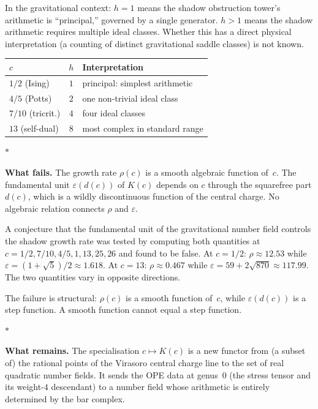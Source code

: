 \documentclass[11pt]{article}
\newcommand{\sep}{\bigskip\begin{center}$*$\end{center}\medskip}
\begin{document}
In the gravitational context: $h = 1$ means the shadow obstruction tower's
arithmetic is ``principal,'' governed by a single generator.
$h > 1$ means the shadow arithmetic requires multiple ideal
classes.  Whether this has a direct physical interpretation
(a counting of distinct gravitational saddle classes)
is not known.

\begin{center}
\small
\renewcommand{\arraystretch}{1.15}
\begin{tabular}{@{}lcl@{}}
$c$ & $h$ & \textbf{Interpretation} \\
\hline
$1/2$ (Ising) & $1$ & principal: simplest arithmetic \\[2pt]
$4/5$ (Potts) & $2$ & one non-trivial ideal class \\[2pt]
$7/10$ (tricrit.) & $4$ & four ideal classes \\[2pt]
$13$ (self-dual) & $8$ & most complex in standard range
\end{tabular}
\end{center}

\sep

\noindent\textbf{What fails.}\enspace
The growth rate $\rho(c)$ is a smooth algebraic function
of~$c$.  The fundamental unit $\varepsilon(d(c))$ of $K(c)$
depends on $c$ through the squarefree part $d(c)$, which is a
wildly discontinuous function of the central charge.  No
algebraic relation connects $\rho$ and $\varepsilon$.

A conjecture that the fundamental unit of the gravitational
number field controls the shadow growth rate was tested by
computing both quantities at $c = 1/2, 7/10, 4/5, 1, 13, 25, 26$
and found to be false.  At $c = 1/2$: $\rho \approx 12.53$
while $\varepsilon = (1+\sqrt{5})/2 \approx 1.618$.  At
$c = 13$: $\rho \approx 0.467$ while
$\varepsilon = 59 + 2\sqrt{870} \approx 117.99$.  The two
quantities vary in opposite directions.

The failure is structural: $\rho(c)$ is a smooth function
of~$c$, while $\varepsilon(d(c))$ is a step function.
A smooth function cannot equal a step function.

\sep

\noindent\textbf{What remains.}\enspace
The specialisation $c \mapsto K(c)$ is a new functor from
(a subset of) the rational points of the Virasoro central
charge line to the set of real quadratic number fields.  It
sends the OPE data at genus~$0$ (the stress tensor and its
weight-$4$ descendant) to a number field whose arithmetic
is entirely determined by the bar complex.
\end{document}
